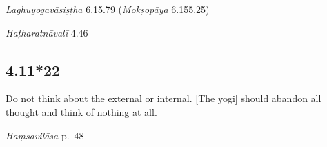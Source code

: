 \begin{ekdosis}
\begin{sources}[hp04_011_21]
\emph{Laghuyogavāsiṣṭha} 6.15.79 (\emph{Mokṣopāya} 6.155.25)
\begin{versinnote}
\end{versinnote}
\end{sources}

\begin{testimonia}[hp04_011_21]
\emph{Haṭharatnāvalī} 4.46
\begin{versinnote}
\end{versinnote}


\end{testimonia}


\subsection*{4.11*22}
\begin{translation}[hp04_011_22]
Do not think about the external or internal. [The yogi] should abandon all thought and think of nothing at all.
\end{translation}


\begin{testimonia}[hp04_011_22]
\emph{Haṃsavilāsa} p.~48
\begin{versinnote}
\end{versinnote}
\end{testimonia}


\end{ekdosis}
